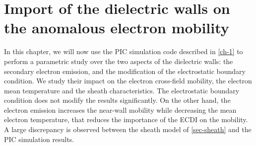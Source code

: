 



\chapter{Import of the dielectric walls on the anomalous electron mobility }
\label{ch-2}

\begin{Chabstract}
In this chapter, we will now use the PIC simulation code described in \cref{ch-1} to perform a parametric study over the two aspects of the dielectric walls\string: the secondary electron emission, and the modification of the electrostatic boundary condition.
We study their impact on the electron cross-field mobility, the electron mean temperature and the sheath characteristics.
The electrostatic boundary condition does not modify the results significantly.
On the other hand, the electron emission increases the near-wall mobility while decreasing the mean electron temperature, that reduces the importance of the \ac{ECDI} on the mobility.
A large discrepancy is observed between the sheath model of \cref{sec-sheath} and the PIC simulation results.
\end{Chabstract}



\minitoc


% 
% 
% 
% 
% 
% 
% 










